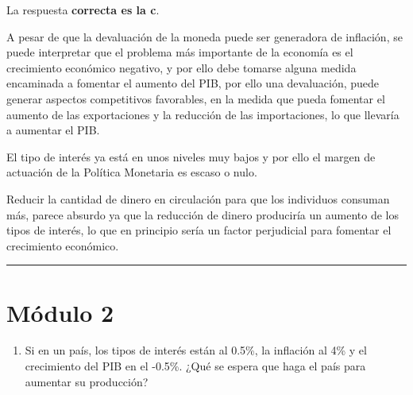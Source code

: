 \documentclass[
  letterpaper,
  DIV=11,
  numbers=noendperiod]{scrreprt}
\providecommand{\tightlist}{%
  \setlength{\itemsep}{0pt}\setlength{\parskip}{0pt}}\usepackage{longtable,booktabs,array}
\begin{document}
\begin{tcolorbox}[enhanced jigsaw, left=2mm, breakable, arc=.35mm, opacityback=0, toprule=.15mm, rightrule=.15mm, leftrule=.75mm, bottomrule=.15mm, colframe=quarto-callout-tip-color-frame, colback=white]
\begin{minipage}[t]{5.5mm}
\textcolor{quarto-callout-tip-color}{\faLightbulb}
\end{minipage}%
\begin{minipage}[t]{\textwidth - 5.5mm}

La respuesta \textbf{correcta es la c}.

A pesar de que la devaluación de la moneda puede ser generadora de
inflación, se puede interpretar que el problema más importante de la
economía es el crecimiento económico negativo, y por ello debe tomarse
alguna medida encaminada a fomentar el aumento del PIB, por ello una
devaluación, puede generar aspectos competitivos favorables, en la
medida que pueda fomentar el aumento de las exportaciones y la reducción
de las importaciones, lo que llevaría a aumentar el PIB.

El tipo de interés ya está en unos niveles muy bajos y por ello el
margen de actuación de la Política Monetaria es escaso o nulo.

Reducir la cantidad de dinero en circulación para que los individuos
consuman más, parece absurdo ya que la reducción de dinero produciría un
aumento de los tipos de interés, lo que en principio sería un factor
perjudicial para fomentar el crecimiento económico.

\end{minipage}%
\end{tcolorbox}

\begin{center}\rule{0.5\linewidth}{0.5pt}\end{center}

\hypertarget{muxf3dulo-2}{%
\chapter*{Módulo 2}\label{muxf3dulo-2}}


\begin{enumerate}
\def\labelenumi{\arabic{enumi}.}
\tightlist
\item
  Si en un país, los tipos de interés están al 0.5\%, la inflación al
  4\% y el crecimiento del PIB en el -0.5\%. ¿Qué se espera que haga el
  país para aumentar su producción?
\end{enumerate}
\end{document}
